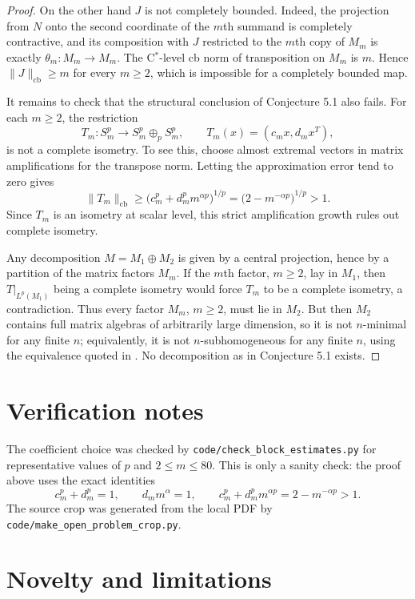 \documentclass[11pt]{amsart}
\theoremstyle{remark}
\newcommand{\cb}{\mathrm{cb}}
\newcommand{\Lp}{L^p}
\newcommand{\Sp}{S^p}
\begin{document}
\begin{proof}
On the other hand $J$ is not completely bounded.  Indeed, the projection from
$N$ onto the second coordinate of the $m$th summand is completely contractive,
and its composition with $J$ restricted to the $m$th copy of $M_m$ is exactly
$\theta_m:M_m\to M_m$.  The C$^*$-level cb norm of transposition on $M_m$ is
$m$.  Hence $\|J\|_{\cb}\geq m$ for every $m\geq2$, which is impossible for a
completely bounded map.

It remains to check that the structural conclusion of Conjecture 5.1 also
fails.  For each $m\geq2$, the restriction
\[
        T_m:\Sp_m\longrightarrow \Sp_m\oplus_p\Sp_m,\qquad
        T_m(x)=(c_mx,d_mx^T),
\]
is not a complete isometry.  To see this, choose almost extremal vectors in
matrix amplifications for the transpose norm.  Letting the approximation
error tend to zero gives
\[
        \|T_m\|_{\cb}
        \geq
        \bigl(c_m^p+d_m^pm^{\alpha p}\bigr)^{1/p}
        =
        \bigl(2-m^{-\alpha p}\bigr)^{1/p}>1.
\]
Since $T_m$ is an isometry at scalar level, this strict amplification growth
rules out complete isometry.

Any decomposition $M=M_1\oplus M_2$ is given by a central projection, hence by
a partition of the matrix factors $M_m$.  If the $m$th factor, $m\geq2$, lay in
$M_1$, then $T|_{\Lp(M_1)}$ being a complete isometry would force $T_m$ to be a
complete isometry, a contradiction.  Thus every factor $M_m$, $m\geq2$, must
lie in $M_2$.  But then $M_2$ contains full matrix algebras of arbitrarily
large dimension, so it is not $n$-minimal for any finite $n$; equivalently,
it is not $n$-subhomogeneous for any finite $n$, using the equivalence quoted
in \cite[Section 2]{Arhancet2020}.  No decomposition as in Conjecture 5.1
exists.
\end{proof}

\section*{Verification notes}

The coefficient choice was checked by
\texttt{code/check\_block\_estimates.py} for representative values of $p$ and
$2\leq m\leq80$.  This is only a sanity check: the proof above uses the exact
identities
\[
        c_m^p+d_m^p=1,\qquad d_mm^\alpha=1,\qquad
        c_m^p+d_m^pm^{\alpha p}=2-m^{-\alpha p}>1.
\]
The source crop was generated from the local PDF by
\texttt{code/make\_open\_problem\_crop.py}.

\section*{Novelty and limitations}
\end{document}
